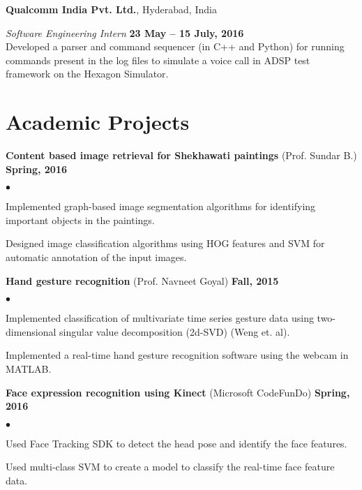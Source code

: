 \documentclass[margin,line]{res}
\newenvironment{list2}{
  \begin{list}{$\bullet$}{%
      \setlength{\itemsep}{0in}
      \setlength{\parsep}{0in} \setlength{\parskip}{0in}
      \setlength{\topsep}{0in} \setlength{\partopsep}{0in} 
      \setlength{\leftmargin}{0.2in}}}{\end{list}}
\begin{document}
\begin{resume}
{\bf Qualcomm India Pvt. Ltd.}, Hyderabad, India

\vspace{-.3cm}
{\em Software Engineering Intern} \hfill {\bf 23 May -- 15 July, 2016}\\
Developed a parser and command sequencer (in C++ and Python) for running commands present in the log files to simulate a voice call in ADSP test framework on the Hexagon Simulator.

\section{\sc Academic Projects}

{\bf Content based image retrieval for Shekhawati paintings} (Prof. Sundar B.) \hfill {\bf Spring, 2016}

\vspace*{.2cm}
\begin{list2}
\item Implemented graph-based image segmentation algorithms for identifying important objects in the paintings.
\item Designed image classification algorithms using HOG features and SVM for automatic annotation of the input images.	
\end{list2}

{\bf Hand gesture recognition} (Prof. Navneet Goyal) \hfill {\bf Fall, 2015}

\vspace*{.2cm}
\begin{list2}
\item Implemented classification of multivariate time series gesture data using two-dimensional singular value decomposition (2d-SVD) (Weng et. al).
\item Implemented a real-time hand gesture recognition software using the webcam in MATLAB.	
\end{list2}

{\bf Face expression recognition using Kinect} (Microsoft CodeFunDo) \hfill {\bf Spring, 2016}

\vspace*{.2cm}
\begin{list2}
\item Used Face Tracking SDK to detect the head pose and identify the face features.
\item Used multi-class SVM to create a model to classify the real-time face feature data.
\end{list2}


\end{resume}
\end{document}

